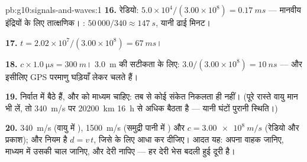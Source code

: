 \begin{solution}{pb:g10:signals-and-waves:1}
\textbf{16.} रेडियो: $5.0\times10^{4}/(3.00\times10^{8}) =
\qty{0.17}{ms}$ --- मानवीय इंद्रियों के लिए तात्क्षणिक।
: $50\,000/340 \approx \qty{147}{s}$, यानी ढाई मिनट।

\textbf{17.} $t = 2.02\times10^{7}/(3.00\times10^{8}) = \qty{67}{ms}$।

\textbf{18.} $c \times \qty{1.0}{\micro s} = \qty{300}{m}$। \qty{3.0}{m} की सटीकता के लिए: $3.0/(3.00\times10^{8}) = \qty{10}{ns}$ --- और इसीलिए
GPS  परमाणु घड़ियाँ लेकर चलते हैं।

\textbf{19.}  निर्वात में बैठे हैं, और  को
माध्यम चाहिए: तब  से कोई संकेत निकलता ही नहीं।
(पूरे रास्ते वायु मान भी लें, तो \qty{340}{m/s} पर \qty{20200}{km} \qty{16}{h} से अधिक बैठता
है --- यानी घंटों पुरानी स्थिति।)

\textbf{20.} \qty{340}{m/s} (वायु में ), \qty{1500}{m/s} (समुद्री पानी
में ) और $c = \qty{3.00e8}{m/s}$ (रेडियो और प्रकाश); और नियम है $d = v\,t$,
जिसे  के लिए आधा कर दीजिए। आदत यह: अपना वाहक जानिए,
माध्यम में उसकी चाल जानिए, और देरी नापिए --- हर देरी भेस बदली हुई दूरी
है।
\end{solution}
